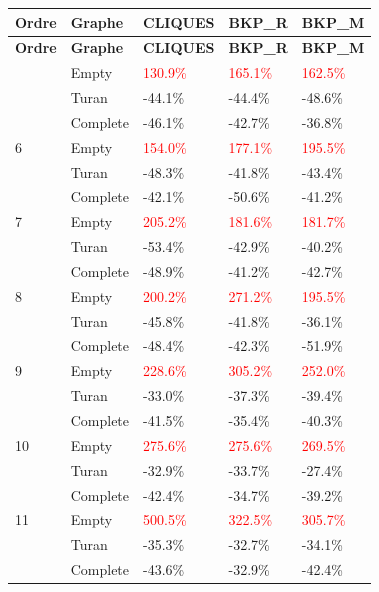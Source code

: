\documentclass[12pt,a4paper]{article}
\begin{document}
\begin{longtable}{|l||l|l|l|l|}
  \hline
  \textbf{Ordre} & \textbf{Graphe} & \textbf{CLIQUES} & \textbf{BKP\_R} & \textbf{BKP\_M} \\
  \hline
  \endfirsthead
  \hline
  \textbf{Ordre} & \textbf{Graphe} & \textbf{CLIQUES} & \textbf{BKP\_R} & \textbf{BKP\_M} \\
  \hline
  \endhead
  \hline
  \endfoot
  \hline
  \endlastfoot
  5 & Empty & \textcolor{red}{130.9\%} & \textcolor{red}{165.1\%} & \textcolor{red}{162.5\%} \\
  & Turan & -44.1\% & -44.4\% & -48.6\% \\
  & Complete & -46.1\% & -42.7\% & -36.8\% \\
  \hline
  6 & Empty & \textcolor{red}{154.0\%} & \textcolor{red}{177.1\%} & \textcolor{red}{195.5\%} \\
  & Turan & -48.3\% & -41.8\% & -43.4\% \\
  & Complete & -42.1\% & -50.6\% & -41.2\% \\
  \hline
  7 & Empty & \textcolor{red}{205.2\%} & \textcolor{red}{181.6\%} & \textcolor{red}{181.7\%} \\
  & Turan & -53.4\% & -42.9\% & -40.2\% \\
  & Complete & -48.9\% & -41.2\% & -42.7\% \\
  \hline
  8 & Empty & \textcolor{red}{200.2\%} & \textcolor{red}{271.2\%} & \textcolor{red}{195.5\%} \\
  & Turan & -45.8\% & -41.8\% & -36.1\% \\
  & Complete & -48.4\% & -42.3\% & -51.9\% \\
  \hline
  9 & Empty & \textcolor{red}{228.6\%} & \textcolor{red}{305.2\%} & \textcolor{red}{252.0\%} \\
  & Turan & -33.0\% & -37.3\% & -39.4\% \\
  & Complete & -41.5\% & -35.4\% & -40.3\% \\
  \hline
  10 & Empty & \textcolor{red}{275.6\%} & \textcolor{red}{275.6\%} & \textcolor{red}{269.5\%} \\
  & Turan & -32.9\% & -33.7\% & -27.4\% \\
  & Complete & -42.4\% & -34.7\% & -39.2\% \\
  \hline
  11 & Empty & \textcolor{red}{500.5\%} & \textcolor{red}{322.5\%} & \textcolor{red}{305.7\%} \\
  & Turan & -35.3\% & -32.7\% & -34.1\% \\
  & Complete & -43.6\% & -32.9\% & -42.4\% \\

\end{longtable}
\end{document}

